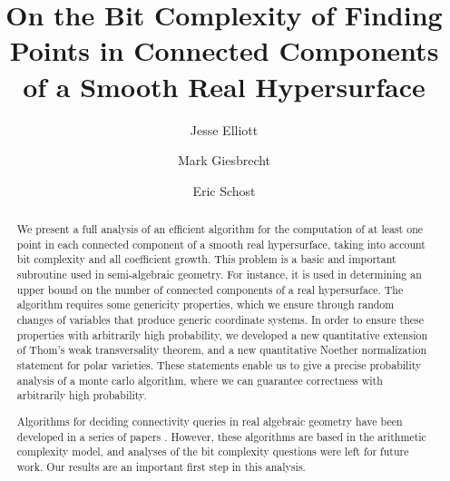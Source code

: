 \documentclass[sigconf]{acmart}
\begin{document}
\title{On the Bit Complexity of Finding Points in Connected Components of a Smooth Real Hypersurface}

\author{Jesse Elliott}

\author{Mark Giesbrecht}

\author{Eric Schost}
\renewcommand{\shortauthors}{Elliott, Giesbrecht, and Schost.}

\begin{abstract}
  We present a full analysis of an efficient algorithm for the
  computation of at least one point in each connected component of a
  smooth real hypersurface, taking into account bit complexity and
  all coefficient growth.  This problem is a basic and important
  subroutine used in semi-algebraic geometry. For instance, it is used
  in determining an upper bound on the number of connected components
  of a real hypersurface. The algorithm requires some genericity
  properties, which we ensure through random changes of variables that
  produce generic coordinate systems. In order to ensure these
  properties with arbitrarily high probability, we developed a new
  quantitative extension of Thom's weak transversality theorem, and a
  new quantitative Noether normalization statement for polar
  varieties. These statements enable us to give a precise probability
  analysis of a monte carlo algorithm, where we can guarantee
  correctness with arbitrarily high probability.

  Algorithms for deciding connectivity queries in real algebraic
  geometry have been developed in a series of papers
  \cite{EMP,SchostMohabBabySteps2011,SchostMohabBabySteps2014,TWT}. However, these algorithms are based in the
  arithmetic complexity model, and analyses of the bit complexity
  questions were left for future work.  Our results are an important
  first step in this analysis.

\end{abstract}
\end{document}
